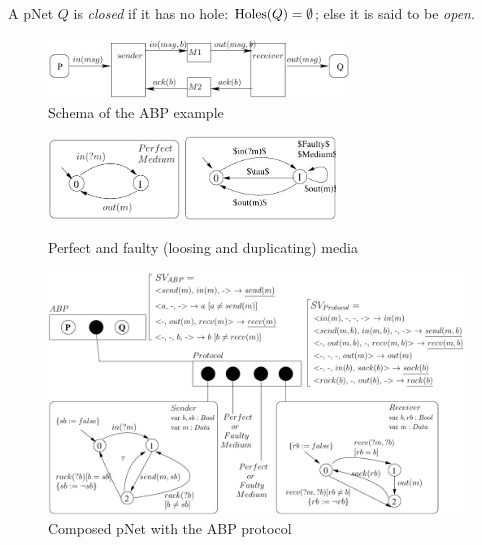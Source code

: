 \documentclass{lncs/llncs}
\newcommand{\TODO}[1]{\textcolor{red}{\textbf{[TODO:#1]}}}
\begin{document}
A pNet $Q$ is \emph{closed} if it has no hole: $\operatorname{Holes}(Q)=\emptyset$; else it
is said to be \emph{open}.

\begin{figure}[t]
  \centerline{
   \includegraphics[width=8cm]{XFIG/ABP-Schema}
   }
   \caption{Schema of the ABP example}  \label{ABP:Schema}
\end{figure}

  
\begin{figure}[t]


  \centerline{
   \includegraphics[width=3.5cm]{XFIG/PerfectMedium}
   \hspace{0.5cm}
   \includegraphics[width=4cm]{XFIG/FaultyMedium}
   }
   \caption{Perfect and faulty (loosing and duplicating) media}  \label{schema:ABP-media}

  \vspace{1cm}
  \centerline{\includegraphics[width=11cm]{XFIG/ABP4-Schema}}
  \caption{Composed pNet with the ABP protocol}  \label{schema:ABP-composed}

\end{figure}
\end{document}
